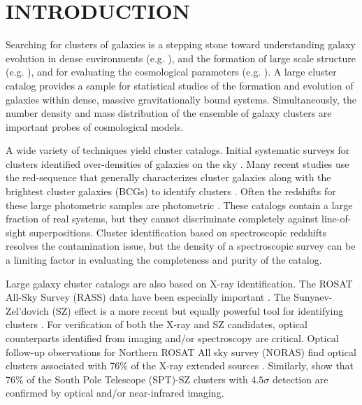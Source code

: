 \documentclass[iop, apj]{emulateapj}
\begin{document}
\section{INTRODUCTION}

Searching for clusters of galaxies is a stepping stone 
 toward understanding galaxy evolution in dense environments 
 (e.g. \citealp{Dressler84, Blanton09, Wetzel14, Haines15}), 
 and the formation of large scale structure (e.g. \citealp{Bahcall88, Postman92, Reiprich02, Chon13}), and 
 for evaluating the cosmological parameters (e.g. \citealp{Voit05, Vikhlinin09, Allen11, Bohringer14}). 
A large cluster catalog provides 
 a sample for statistical studies of the formation and evolution of galaxies 
 within dense, massive gravitationally bound systems. 
Simultaneously,  
 the number density and mass distribution of the ensemble of galaxy clusters 
 are important probes of cosmological models. 

A wide variety of techniques yield cluster catalogs.  
Initial systematic surveys for clusters 
 identified over-densities of galaxies on the sky
 \citep{Abell58, Abell89, Zwicky68}. 
Many recent studies use the red-sequence 
 that generally characterizes cluster galaxies along with the brightest cluster galaxies (BCGs)
 to identify clusters \citep{Gladders00, Koester07, Hao10, Oguri14, Rykoff14, Oguri17}.
Often the redshifts for these large photometric samples are photometric \citep{Wen09, Wen12, Szabo11, Durret15}. 
These catalogs contain a large fraction of real systems, 
 but they cannot discriminate completely against line-of-sight superpositions.
Cluster identification based on spectroscopic redshifts resolves the contamination issue, 
 but the density of a spectroscopic survey can be a limiting factor in evaluating the completeness and purity of the catalog. 

Large galaxy cluster catalogs 
 are also based on X-ray identification. 
The ROSAT All-Sky Survey (RASS) data have been especially important
 \citep{Ebeling98, Bohringer00, Bohringer04, Ebeling10, Bohringer13, Bohringer17}. 
The Sunyaev-Zel'dovich (SZ) effect \citep{Sunyaev72} is 
 a more recent but equally powerful tool
 for identifying clusters \citep{Vanderlinde10, Marriage11, Planck15, Planck16, Bleem15}. 
For verification of both the X-ray and SZ candidates, 
 optical counterparts identified from imaging and/or spectroscopy are critical. 
Optical follow-up observations for Northern ROSAT All sky survey (NORAS)
 find optical clusters associated with 76\% of the X-ray extended sources \citep{Bohringer00}. 
Similarly, \citet{Bleem15} show that
 $76\%$ of the South Pole Telescope (SPT)-SZ clusters with $4.5\sigma$ detection 
 are confirmed by optical and/or near-infrared imaging.
  
\end{document}
